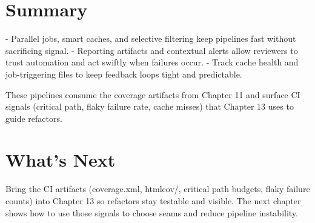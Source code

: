 \section{Summary}
- Parallel jobs, smart caches, and selective filtering keep pipelines fast without sacrificing signal.
- Reporting artifacts and contextual alerts allow reviewers to trust automation and act swiftly when failures occur.
- Track cache health and job-triggering files to keep feedback loops tight and predictable.

These pipelines consume the coverage artifacts from Chapter 11 and surface CI signals (critical path, flaky failure rate, cache misses) that Chapter 13 uses to guide refactors.

\section{What's Next}
Bring the CI artifacts (coverage.xml, htmlcov/, critical path budgets, flaky failure counts) into Chapter 13 so refactors stay testable and visible. The next chapter shows how to use those signals to choose seams and reduce pipeline instability.
